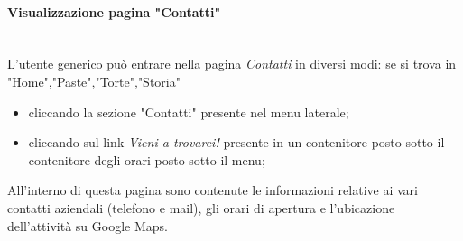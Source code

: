 \paragraph{Visualizzazione pagina "Contatti"}\mbox{}\\
\label{par:VisContatti}
L'utente generico può entrare nella pagina \emph{Contatti} in diversi modi: se si trova in "Home","Paste","Torte","Storia"
\begin{itemize}
	\item cliccando la sezione "Contatti" presente nel menu laterale; 
	\item cliccando sul link \emph{Vieni a trovarci!} presente in un contenitore posto sotto il contenitore degli orari posto sotto il menu;
\end{itemize}
All'interno di questa pagina sono contenute le informazioni relative ai vari contatti aziendali (telefono e mail),
gli orari di apertura e l'ubicazione dell'attività su Google Maps.
